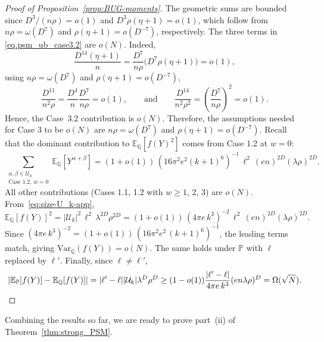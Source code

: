 \documentclass[11pt, letterpaper]{article}
\numberwithin{equation}{section}
\newcommand{\E}{\mathbb{E}}
\newcommand{\PP}{\mathbb{P}}
\newcommand{\QQ}{\mathbb{Q}}
\newcommand{\U}{\mathcal{U}}
\begin{document}
\begin{proof}[Proof of Proposition~\ref{prop:BUG-moments}]
The geometric sums are bounded since $D^3/(n\rho)=o(1)$ and $D^3\rho(\eta+1)=o(1)$, which follow from $n\rho=\omega(D^7)$ and $\rho(\eta+1)=o(D^{-7})$, respectively. The three terms in \eqref{eq.psm_ub_case3.2} are $o(N)$. Indeed,
\[\frac{D^{14}(\eta+1)}{n}=\frac{D^7}{n\rho}\bigl(D^7\rho(\eta+1)\bigr)=o(1),\]
using $n\rho=\omega(D^7)$ and $\rho(\eta+1)=o(D^{-7})$,
\[\frac{D^{11}}{n^2\rho}=\frac{D^4}{n}\frac{D^7}{n\rho}=o(1), \qquad \text{and} \qquad \frac{D^{14}}{n^2\rho^2}=\left(\frac{D^7}{n\rho}\right)^2=o(1).\]
Hence, the Case~3.2 contribution is $o(N)$.
Therefore, the assumptions needed for Case 3 to be $o(N)$ are
$n\rho=\omega(D^7)$ and $\rho(\eta+1)=o(D^{-7})$.
 Recall that the dominant contribution to $\E_\QQ[f(Y)^2]$ comes from Case 1.2 at $w=0$:
\[
\sum_{\substack{\alpha,\beta\in\U_k\\\text{Case 1.2},\, w=0}} \E_\QQ[Y^{\alpha+\beta}]
= (1+o(1))\,(16\pi^2 e^2 (k+1)^6)^{-1}\,\ell^2\,(en)^{2D}(\lambda\rho)^{2D}.
\]
All other contributions (Cases 1.1, 1.2 with $w\geq 1$, 2, 3) are $o(N)$. From~\eqref{eq:size-U_k-app},
\[
\E_\QQ[f(Y)]^2 = |\U_k|^2\,\ell^2\,\lambda^{2D}\rho^{2D}
= (1+o(1))\,(4\pi e\, k^3)^{-2}\,\ell^2\,(en)^{2D}(\lambda\rho)^{2D}.
\]
Since $(4\pi e\, k^3)^{-2} = (1+o(1))\,(16\pi^2 e^2\,(k+1)^6)^{-1}$, the leading terms match, giving
$\mathrm{Var}_\QQ(f(Y)) = o(N)$. The same holds under $\PP$ with $\ell$ replaced by $\ell'$.
Finally, since $\ell\neq\ell'$, 
\[
|\E_\PP[f(Y)] - \E_\QQ[f(Y)]|
= |\ell'-\ell||\U_k|\lambda^D\rho^D
\geq (1-o(1))\frac{|\ell'-\ell|}{4\pi e\,k^3}(en\lambda\rho)^D
= \Omega(\sqrt{N}). \qedhere
\]
\end{proof}
\noindent Combining the results so far, we are ready to prove part~(ii) of
Theorem~\ref{thm:strong_PSM}.
\end{document}
